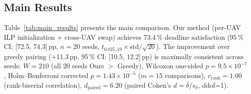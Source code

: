 \documentclass[journal]{IEEEtran}
\begin{document}
\subsection{Main Results}

Table~\ref{tab:main_results} presents the main comparison.
Our method (per-UAV ILP initialization + cross-UAV swap) achieves 73.4\,\% deadline satisfaction (95\,\% CI: [72.5, 74.3]\,pp, $n\!=\!20$ seeds, $t_{0.025,19}\!\times\!\text{std}/\!\sqrt{20}$).
The improvement over greedy pairing (+11.3\,pp, 95\,\% CI: [10.5, 12.2]\,pp) is maximally consistent across seeds: $W\!=\!210$ (all 20 seeds Ours $>$ Greedy), Wilcoxon one-sided $p\!=\!9.5\!\times\!10^{-7}$, Holm--Bonferroni corrected $p\!=\!1.43\!\times\!10^{-5}$ ($m\!=\!15$ comparisons), $r_{\text{rank}}\!=\!1.00$ (rank-biserial correlation), $d_{\text{paired}}\!=\!6.20$ (paired Cohen's $d = \bar{\delta}/s_\delta$, ddof=1).
\end{document}
